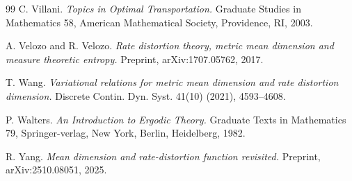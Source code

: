 \documentclass[11pt,a4paper,reqno]{amsart}
\theoremstyle{plain}
\theoremstyle{definition}
\begin{document}
\begin{thebibliography}{99}
C. Villani.
\newblock \emph{Topics in Optimal Transportation.}
\newblock Graduate Studies in Mathematics 58, American Mathematical Society, Providence, RI, 2003.

A. Velozo and R. Velozo.
\newblock\emph{Rate distortion theory, metric mean dimension and measure theoretic entropy.}	
\newblock Preprint, arXiv:1707.05762, 2017.


T. Wang.
\newblock \emph{Variational relations for metric mean dimension and rate distortion dimension.}
\newblock Discrete Contin. Dyn. Syst. 41(10) (2021), 4593--4608.

P. Walters.
\newblock \emph{An Introduction to Ergodic Theory.}
\newblock Graduate Texts in Mathematics 79, Springer-verlag, New York, Berlin, Heidelberg, 1982.

R. Yang.
\newblock\emph{Mean dimension and rate-distortion function revisited.}	
\newblock Preprint, arXiv:2510.08051, 2025.



\end{thebibliography}
\end{document}
